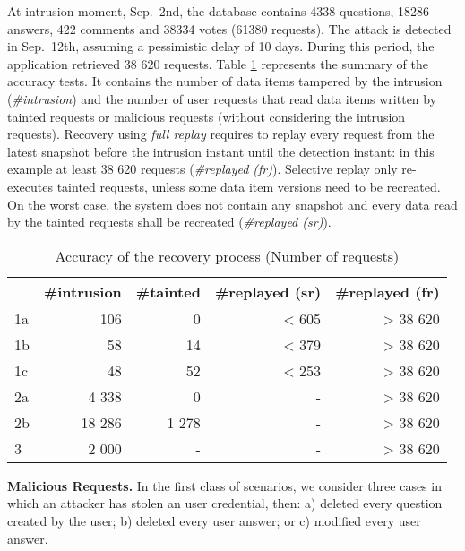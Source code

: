 At intrusion moment, Sep.~2nd, the database contains 4338 questions, 18286 answers, 422 comments and 38334 votes (61380 requests). The attack is detected in Sep.~12th, assuming a pessimistic delay of 10 days. During this period, the application retrieved 38 620 requests. Table \ref{tab:accuracy} represents the summary of the accuracy tests. It contains the number of data items tampered by the intrusion (\emph{\#intrusion}) and the number of user requests that read data items written by  tainted requests or malicious requests (without considering the intrusion requests). Recovery using \textit{full replay} requires to replay every request from the latest snapshot before the intrusion instant until the detection instant: in this example at least 38 620 requests (\emph{\#replayed (fr)}). Selective replay only re-executes tainted requests, unless some data item versions need to be recreated. On the worst case, the system does not contain any snapshot and every data read by the tainted requests shall be recreated (\emph{\#replayed (sr)}). 

\begin{table}
\footnotesize
\begin{tabular}{l|rrrr}
    & \#intrusion & \#tainted & \#replayed (sr) & \#replayed (fr) \\ \hline
1a       & 106          & 0          & < 605           & > 38 620  \\
1b       & 58           & 14         & < 379           & > 38 620  \\
1c       & 48           & 52         & < 253           & > 38 620  \\
2a       & 4 338        & 0          &  -              & > 38 620  \\
2b       & 18 286       & 1 278      &  -              & > 38 620  \\
3        & 2 000        & -          &  -              & > 38 620  \\
\end{tabular}
  \caption{Accuracy of the recovery process (Number of requests)}
  \label{tab:accuracy}
  \vspace{-5mm}
\end{table}


\textbf{Malicious Requests.} 
 In the first class of scenarios, we consider three  cases in which an attacker has stolen an user credential, then: a) deleted every question created by the user; b) deleted every user answer; or c) modified every user answer.

